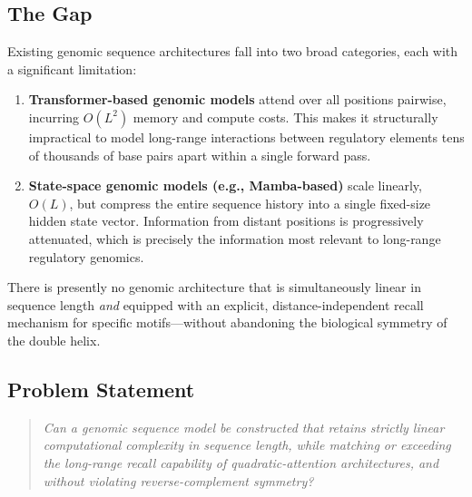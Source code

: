 \documentclass[11pt,a4paper]{article}
\begin{document}
\subsection{The Gap}
Existing genomic sequence architectures fall into two broad categories, each with a significant limitation:
\begin{enumerate}[label=(\roman*)]
    \item \textbf{Transformer-based genomic models} attend over all positions pairwise, incurring $O(L^2)$ memory and compute costs. This makes it structurally impractical to model long-range interactions between regulatory elements tens of thousands of base pairs apart within a single forward pass.
    \item \textbf{State-space genomic models (e.g., Mamba-based)} scale linearly, $O(L)$, but compress the entire sequence history into a single fixed-size hidden state vector. Information from distant positions is progressively attenuated, which is precisely the information most relevant to long-range regulatory genomics.
\end{enumerate}
There is presently no genomic architecture that is simultaneously linear in sequence length \emph{and} equipped with an explicit, distance-independent recall mechanism for specific motifs—without abandoning the biological symmetry of the double helix.

\subsection{Problem Statement}
\begin{quote}
\itshape
Can a genomic sequence model be constructed that retains strictly linear computational complexity in sequence length, while matching or exceeding the long-range recall capability of quadratic-attention architectures, and without violating reverse-complement symmetry?
\end{quote}

\end{document}
